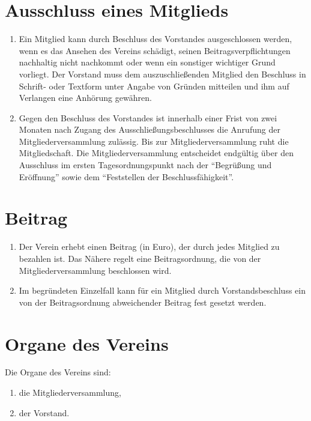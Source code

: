 \documentclass[a4paper]{article}
\begin{document}
\section{Ausschluss eines Mitglieds}
\begin{enumerate}
	\item Ein Mitglied kann durch Beschluss des Vorstandes ausgeschlossen werden, wenn es das Ansehen des Vereins schädigt, seinen Beitragsverpflichtungen nachhaltig nicht nachkommt oder wenn ein sonstiger wichtiger Grund vorliegt. Der Vorstand muss dem auszuschließenden Mitglied den Beschluss in Schrift- oder Textform unter Angabe von Gründen mitteilen und ihm auf Verlangen eine Anhörung gewähren.
	\item Gegen den Beschluss des Vorstandes ist innerhalb einer Frist von zwei Monaten nach Zugang des Ausschließungsbeschlusses die Anrufung der Mitgliederversammlung zulässig. Bis zur Mitgliederversammlung ruht die Mitgliedschaft. Die Mitgliederversammlung entscheidet endgültig über den Ausschluss im ersten Tagesordnungspunkt nach der \enquote{Begrüßung und Eröffnung} sowie dem \enquote{Feststellen der Beschlussfähigkeit}.
\end{enumerate}

\section{Beitrag}
\begin{enumerate}
	\item Der Verein erhebt einen Beitrag (in Euro), der durch jedes Mitglied zu bezahlen ist. Das Nähere regelt eine Beitragsordnung, die von der Mitgliederversammlung beschlossen wird.
	\item Im begründeten Einzelfall kann für ein Mitglied durch Vorstandsbeschluss ein von der Beitragsordnung abweichender Beitrag fest gesetzt werden.
\end{enumerate}

\section{Organe des Vereins}
Die Organe des Vereins sind:
\begin{enumerate}[1.]
	\item die Mitgliederversammlung,
	\item der Vorstand.
\end{enumerate}
\end{document}
